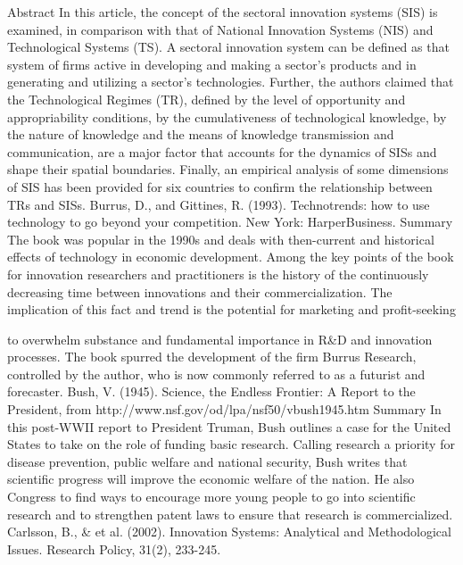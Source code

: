 \documentclass[a4paper,11pt]{article}
\begin{document}
Abstract
In this article, the concept of the sectoral innovation systems (SIS) is examined, in comparison with that of National Innovation Systems (NIS) and Technological Systems (TS). A sectoral innovation system can be defined as that system of firms active in developing and making a sector’s products and in generating and utilizing a sector’s technologies. Further, the authors claimed that the Technological Regimes (TR), defined by the level of opportunity and appropriability conditions, by the cumulativeness of technological knowledge, by the nature of knowledge and the means of knowledge transmission and communication, are a major factor that accounts for the dynamics of SISs and shape their spatial boundaries. Finally, an empirical analysis of some dimensions of SIS has been provided for six countries to confirm the relationship between TRs and SISs.
Burrus, D., and Gittines, R. (1993). Technotrends: how to use technology to go beyond your competition. New York: HarperBusiness.
Summary
The book was popular in the 1990s and deals with then-current and historical effects of technology in economic development. Among the key points of the book for innovation researchers and practitioners is the history of the continuously decreasing time between innovations and their commercialization. The implication of this fact and trend is the potential for marketing and profit-seeking
 


to overwhelm substance and fundamental importance in R&D and innovation processes. The book spurred the development of the firm Burrus Research, controlled by the author, who is now commonly referred to as a futurist and forecaster.
Bush, V. (1945). Science, the Endless Frontier: A Report to the President, from http://www.nsf.gov/od/lpa/nsf50/vbush1945.htm
Summary
In this post-WWII report to President Truman, Bush outlines a case for the United States to take on the role of funding basic research. Calling research a priority for disease prevention, public welfare and national security, Bush writes that scientific progress will improve the economic welfare of the nation. He also Congress to find ways to encourage more young people to go into scientific research and to strengthen patent laws to ensure that research is commercialized.
Carlsson, B., & et al. (2002). Innovation Systems: Analytical and Methodological Issues.
Research Policy, 31(2), 233-245.
\end{document}

